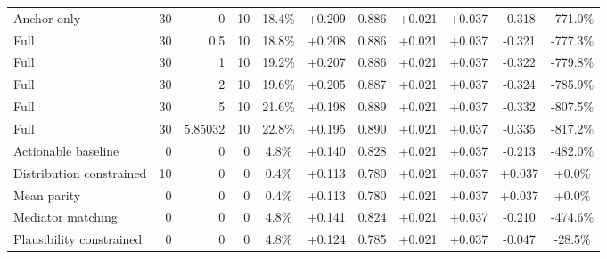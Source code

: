 \begin{table}[htbp]
\begin{tabular}{lrrrccccccc}
Anchor only & 30 & 0 & 10 & 18.4\% & +0.209 & 0.886 & +0.021 & +0.037 & -0.318 & -771.0\% \\
Full & 30 & 0.5 & 10 & 18.8\% & +0.208 & 0.886 & +0.021 & +0.037 & -0.321 & -777.3\% \\
Full & 30 & 1 & 10 & 19.2\% & +0.207 & 0.886 & +0.021 & +0.037 & -0.322 & -779.8\% \\
Full & 30 & 2 & 10 & 19.6\% & +0.205 & 0.887 & +0.021 & +0.037 & -0.324 & -785.9\% \\
Full & 30 & 5 & 10 & 21.6\% & +0.198 & 0.889 & +0.021 & +0.037 & -0.332 & -807.5\% \\
Full & 30 & 5.85032 & 10 & 22.8\% & +0.195 & 0.890 & +0.021 & +0.037 & -0.335 & -817.2\% \\
Actionable baseline & 0 & 0 & 0 & 4.8\% & +0.140 & 0.828 & +0.021 & +0.037 & -0.213 & -482.0\% \\
Distribution constrained & 10 & 0 & 0 & 0.4\% & +0.113 & 0.780 & +0.021 & +0.037 & +0.037 & +0.0\% \\
Mean parity & 0 & 0 & 0 & 0.4\% & +0.113 & 0.780 & +0.021 & +0.037 & +0.037 & +0.0\% \\
Mediator matching & 0 & 0 & 0 & 4.8\% & +0.141 & 0.824 & +0.021 & +0.037 & -0.210 & -474.6\% \\
Plausibility constrained & 0 & 0 & 0 & 4.8\% & +0.124 & 0.785 & +0.021 & +0.037 & -0.047 & -28.5\% \\
\bottomrule
\end{tabular}
\end{table}